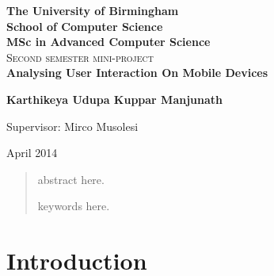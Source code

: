 \documentclass[12pt]{report}
\begin{document}
\begin{titlepage}
\begin{center}
\lstset{language=Java}  
\textbf{\LARGE The University of Birmingham}\\[0.35cm]
\textbf{\LARGE School of Computer Science}\\[0.35cm]
\textbf{\LARGE MSc in Advanced Computer Science}\\[2.5cm]

\textsc{\Large Second semester mini-project}\\[2.5cm]


{ \huge \bfseries Analysing User Interaction On Mobile Devices \\[1cm] }

{\large \textbf{Karthikeya Udupa Kuppar Manjunath}\\[1cm]}

\large{Supervisor: Mirco Musolesi}


\vfill

{\large April 2014}

\end{center}
\end{titlepage}

\begin{abstract}

abstract here.
\linebreak\linebreak\linebreak\linebreak
\begin{center}
\begin{keywords}
keywords here.
\end{keywords}
\end{center}
\end{abstract}


\tableofcontents
\listoffigures
\listoftables
\newpage

\chapter{Introduction}
\noindent
\end{document}
